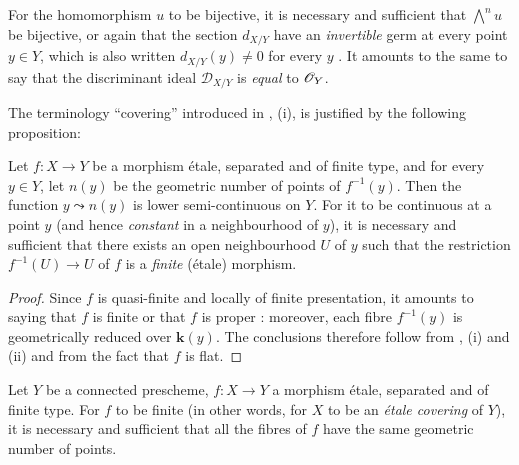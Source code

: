 For the homomorphism $u$ to be bijective, it is necessary and sufficient that $\bigwedge^n u$ be bijective, or again that the section $d_{X/Y}$ have an \emph{invertible} germ at every point $y\in Y$, which is also written $d_{X/Y}(y)\neq 0$ for every $y$ .
It amounts to the same to say that the discriminant ideal $\mathscr{D}_{X/Y}$ is \emph{equal} to $\mathscr{O}_Y$.

The terminology ``covering'' introduced in , (i), is justified by the following proposition:

\begin{proposition}[18.2.8]
\label{IV.18.2.8}
Let $f:X\to Y$ be a morphism \'etale, separated and of finite type, and for every $y\in Y$, let $n(y)$ be the geometric number of points of $f^{-1}(y)$.
Then the function $y\leadsto n(y)$ is lower semi-continuous on $Y$.
For it to be continuous at a point $y$ \textup{(and hence \emph{constant} in a neighbourhood of $y$)}, it is necessary and sufficient that there exists an open neighbourhood $U$ of $y$ such that the restriction $f^{-1}(U)\to U$ of $f$ is a \emph{finite} (\'etale) morphism.
\end{proposition}

\begin{proof}
Since $f$ is quasi-finite  and locally of finite presentation, it amounts to saying that $f$ is finite or that $f$ is proper :
moreover, each fibre $f^{-1}(y)$ is geometrically reduced over $\boldsymbol{k}(y)$.
The conclusions therefore follow from , (i) and (ii) and from the fact that $f$ is flat.
\end{proof}

\begin{corollary}[18.2.9]
\label{IV.18.2.9}
Let $Y$ be a connected prescheme, $f:X\to Y$ a morphism \'etale, separated and of finite type.
For $f$ to be finite \textup{(in other words, for $X$ to be an \emph{\'etale covering} of $Y$)}, it is necessary and sufficient that all the fibres of $f$ have the same geometric number of points.
\end{corollary}

